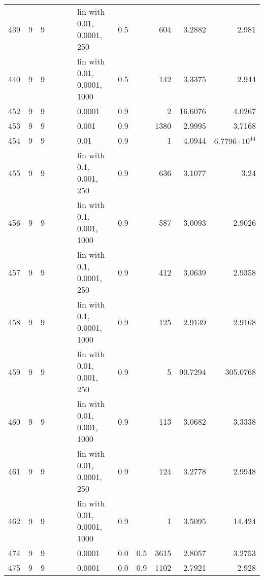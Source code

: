 \begin{longtable}{lrrrrrlrrrrr}
  439 &       9 & 9 &   &   &   &  lin with 0.01, 0.0001, 250 &      0.5 &        &     604 &                 3.2882 &                  2.981 \\
  440 &       9 & 9 &   &   &   & lin with 0.01, 0.0001, 1000 &      0.5 &        &     142 &                 3.3375 &                  2.944 \\
  452 &       9 & 9 &   &   &   &                      0.0001 &      0.9 &        &       2 &                16.6076 &                 4.0267 \\
  453 &       9 & 9 &   &   &   &                       0.001 &      0.9 &        &    1380 &                 2.9995 &                 3.7168 \\
  454 &       9 & 9 &   &   &   &                        0.01 &      0.9 &        &       1 &                 4.0944 &  $6.7796\cdot 10^{44}$ \\
  455 &       9 & 9 &   &   &   &    lin with 0.1, 0.001, 250 &      0.9 &        &     636 &                 3.1077 &                   3.24 \\
  456 &       9 & 9 &   &   &   &   lin with 0.1, 0.001, 1000 &      0.9 &        &     587 &                 3.0093 &                 2.9026 \\
  457 &       9 & 9 &   &   &   &   lin with 0.1, 0.0001, 250 &      0.9 &        &     412 &                 3.0639 &                 2.9358 \\
  458 &       9 & 9 &   &   &   &  lin with 0.1, 0.0001, 1000 &      0.9 &        &     125 &                 2.9139 &                 2.9168 \\
  459 &       9 & 9 &   &   &   &   lin with 0.01, 0.001, 250 &      0.9 &        &       5 &                90.7294 &               305.0768 \\
  460 &       9 & 9 &   &   &   &  lin with 0.01, 0.001, 1000 &      0.9 &        &     113 &                 3.0682 &                 3.3338 \\
  461 &       9 & 9 &   &   &   &  lin with 0.01, 0.0001, 250 &      0.9 &        &     124 &                 3.2778 &                 2.9948 \\
  462 &       9 & 9 &   &   &   & lin with 0.01, 0.0001, 1000 &      0.9 &        &       1 &                 3.5095 &                 14.424 \\
  474 &       9 & 9 &   &   &   &                      0.0001 &      0.0 &    0.5 &    3615 &                 2.8057 &                 3.2753 \\
  475 &       9 & 9 &   &   &   &                      0.0001 &      0.0 &    0.9 &    1102 &                 2.7921 &                  2.928 \\

\end{longtable}
